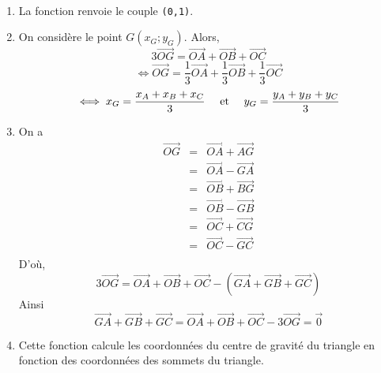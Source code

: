 \begin{correction}~
	\begin{enumerate}
		\item La fonction renvoie le couple \texttt{(0,1)}.
		\item On considère le point $G(x_G;y_G)$. Alors,  $$3\overrightarrow{OG}=\overrightarrow{OA}+\overrightarrow{OB}+\overrightarrow{OC}$$ $$\iff\overrightarrow{OG}=\frac{1}{3}\overrightarrow{OA}+\frac{1}{3}\overrightarrow{OB}+\frac{1}{3}\overrightarrow{OC}$$ $$\iff x_G = \frac{x_A+x_B+x_C}{3}~~~\textnormal{ et }~~~
		y_G = \frac{y_A+y_B+y_C}{3}$$
		\item On a $$\begin{matrix}
		\overrightarrow{OG}&=&\overrightarrow{OA}+\overrightarrow{AG}\\
		&=&\overrightarrow{OA}-\overrightarrow{GA}\\
		&=&\overrightarrow{OB}+\overrightarrow{BG}\\
		&=&\overrightarrow{OB}-\overrightarrow{GB}\\
		&=&\overrightarrow{OC}+\overrightarrow{CG}\\
		&=&\overrightarrow{OC}-\overrightarrow{GC}\\
		\end{matrix}$$
		D'où, $$3\overrightarrow{OG}=\overrightarrow{OA}+\overrightarrow{OB}+\overrightarrow{OC}-\left(
		\overrightarrow{GA}+\overrightarrow{GB}+\overrightarrow{GC}\right)$$
		Ainsi $$\overrightarrow{GA}+\overrightarrow{GB}+\overrightarrow{GC} = \overrightarrow{OA}+\overrightarrow{OB}+\overrightarrow{OC}-3\overrightarrow{OG}=\overrightarrow{0}$$
		\item Cette fonction calcule les coordonnées du centre de gravité du triangle en fonction des coordonnées des sommets du triangle.
	\end{enumerate}
\end{correction}



